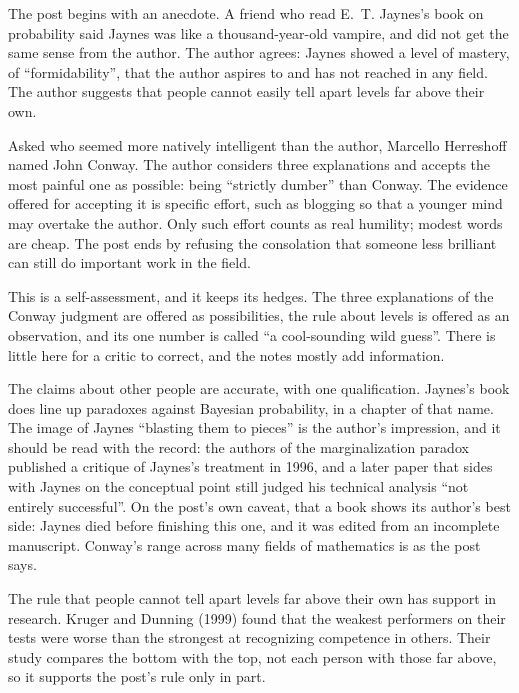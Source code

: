 \begin{afterword}
\summaryhead

The post begins with an anecdote. A friend who read E.~T. Jaynes's book on probability said Jaynes was like a thousand-year-old vampire, and did not get the same sense from the author. The author agrees: Jaynes showed a level of mastery, of ``formidability'', that the author aspires to and has not reached in any field. The author suggests that people cannot easily tell apart levels far above their own.

Asked who seemed more natively intelligent than the author, Marcello Herreshoff named John Conway. The author considers three explanations and accepts the most painful one as possible: being ``strictly dumber'' than Conway. The evidence offered for accepting it is specific effort, such as blogging so that a younger mind may overtake the author. Only such effort counts as real humility; modest words are cheap. The post ends by refusing the consolation that someone less brilliant can still do important work in the field.

\responsehead

This is a self-assessment, and it keeps its hedges. The three explanations of the Conway judgment are offered as possibilities, the rule about levels is offered as an observation, and its one number is called ``a cool-sounding wild guess''. There is little here for a critic to correct, and the notes mostly add information.

The claims about other people are accurate, with one qualification. Jaynes's book does line up paradoxes against Bayesian probability, in a chapter of that name. The image of Jaynes ``blasting them to pieces'' is the author's impression, and it should be read with the record: the authors of the marginalization paradox published a critique of Jaynes's treatment in 1996, and a later paper that sides with Jaynes on the conceptual point still judged his technical analysis ``not entirely successful''. On the post's own caveat, that a book shows its author's best side: Jaynes died before finishing this one, and it was edited from an incomplete manuscript. Conway's range across many fields of mathematics is as the post says.

The rule that people cannot tell apart levels far above their own has support in research. Kruger and Dunning (1999) found that the weakest performers on their tests were worse than the strongest at recognizing competence in others. Their study compares the bottom with the top, not each person with those far above, so it supports the post's rule only in part.


\end{afterword}
